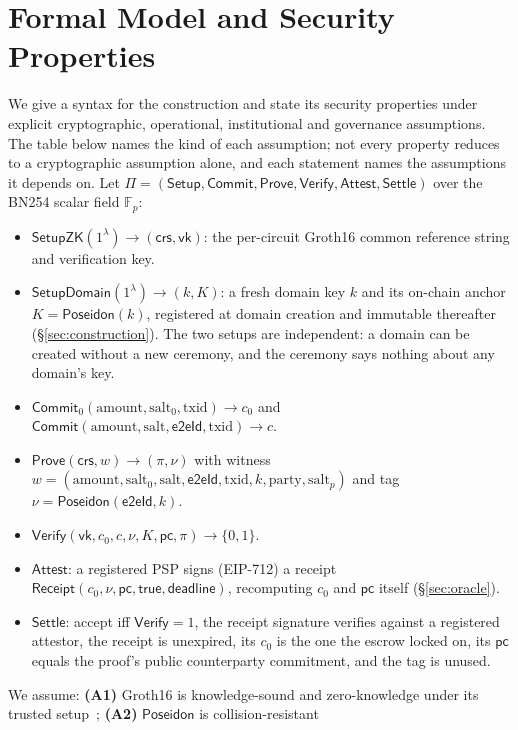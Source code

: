 \documentclass[11pt]{article}
\newcommand{\Poseidon}{\ensuremath{\mathsf{Poseidon}}}
\newcommand{\Fp}{\ensuremath{\mathbb{F}_p}}
\newcommand{\eeid}{\ensuremath{\mathsf{e2eId}}}
\begin{document}
\section{Formal Model and Security Properties}
\label{sec:formal}

We give a syntax for the construction and state its security properties under
explicit cryptographic, operational, institutional and governance assumptions.
The table below names the kind of each assumption; not every property reduces
to a cryptographic assumption alone, and each statement names the assumptions
it depends on. Let $\Pi=(\mathsf{Setup},\mathsf{Commit},\mathsf{Prove},
\mathsf{Verify},\mathsf{Attest},\mathsf{Settle})$ over the BN254 scalar field $\Fp$:
\begin{itemize}
\item $\mathsf{SetupZK}(1^\lambda)\to(\mathsf{crs},\mathsf{vk})$: the per-circuit
Groth16 common reference string and verification key.
\item $\mathsf{SetupDomain}(1^\lambda)\to(k,K)$: a fresh domain key $k$ and its
on-chain anchor $K=\Poseidon(k)$, registered at domain creation and immutable
thereafter (\S\ref{sec:construction}). The two setups are independent: a domain
can be created without a new ceremony, and the ceremony says nothing about any
domain's key.
\item $\mathsf{Commit}_0(\text{amount},\text{salt}_0,\text{txid})\to c_0$ and
$\mathsf{Commit}(\text{amount},\text{salt},\eeid,\text{txid})\to c$.
\item $\mathsf{Prove}(\mathsf{crs},w)\to(\pi,\nu)$ with witness $w=(\text{amount},
\text{salt}_0,\text{salt},\eeid,\text{txid},k,\text{party},\text{salt}_p)$ and
tag $\nu=\Poseidon(\eeid,k)$.
\item $\mathsf{Verify}(\mathsf{vk},c_0,c,\nu,K,\mathsf{pc},\pi)\to\{0,1\}$.
\item $\mathsf{Attest}$: a registered PSP signs (EIP-712) a receipt
$\mathsf{Receipt}(c_0,\nu,\mathsf{pc},\mathsf{true},\mathsf{deadline})$,
recomputing $c_0$ and $\mathsf{pc}$ itself (\S\ref{sec:oracle}).
\item $\mathsf{Settle}$: accept iff $\mathsf{Verify}=1$, the receipt signature
verifies against a registered attestor, the receipt is unexpired, its $c_0$ is the
one the escrow locked on, its $\mathsf{pc}$ equals the proof's public counterparty
commitment, and the tag is unused.
\end{itemize}
We assume: \textbf{(A1)} Groth16 is knowledge-sound and zero-knowledge under its
trusted setup~\cite{groth16}; \textbf{(A2)} $\Poseidon$ is collision-resistant
\end{document}
